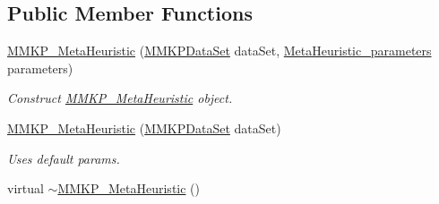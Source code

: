 \subsection*{Public Member Functions}
\begin{DoxyCompactItemize}
\item 
\hyperlink{class_m_m_k_p___meta_heuristic_ad4e9b2d9eb8a3c4c463af4dc1be94147}{M\+M\+K\+P\+\_\+\+Meta\+Heuristic} (\hyperlink{class_m_m_k_p_data_set}{M\+M\+K\+P\+Data\+Set} data\+Set, \hyperlink{class_meta_heuristic__parameters}{Meta\+Heuristic\+\_\+parameters} parameters)
\begin{DoxyCompactList}\small\item\em Construct \hyperlink{class_m_m_k_p___meta_heuristic}{M\+M\+K\+P\+\_\+\+Meta\+Heuristic} object. \end{DoxyCompactList}\item 
\hypertarget{class_m_m_k_p___meta_heuristic_a95161dd44bc787c290bdcf58013c3775}{\hyperlink{class_m_m_k_p___meta_heuristic_a95161dd44bc787c290bdcf58013c3775}{M\+M\+K\+P\+\_\+\+Meta\+Heuristic} (\hyperlink{class_m_m_k_p_data_set}{M\+M\+K\+P\+Data\+Set} data\+Set)}\label{class_m_m_k_p___meta_heuristic_a95161dd44bc787c290bdcf58013c3775}

\begin{DoxyCompactList}\small\item\em Uses default params. \end{DoxyCompactList}\item 
\hypertarget{class_m_m_k_p___meta_heuristic_a571af8ce6fb011162d4af50526123fce}{virtual \hyperlink{class_m_m_k_p___meta_heuristic_a571af8ce6fb011162d4af50526123fce}{$\sim$\+M\+M\+K\+P\+\_\+\+Meta\+Heuristic} ()}\label{class_m_m_k_p___meta_heuristic_a571af8ce6fb011162d4af50526123fce}


\end{DoxyCompactItemize}
